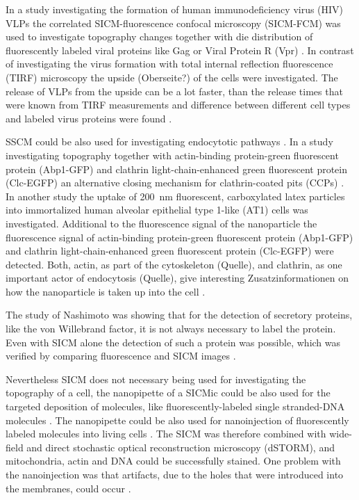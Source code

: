 In a study investigating the formation of human immunodeficiency virus (HIV) VLPs the correlated
SICM-fluorescence confocal microscopy (SICM-FCM) was used to investigate topography changes
together with die distribution of fluorescently labeled viral proteins like Gag or Viral Protein R 
(Vpr) \cite{Bednarska2020}. In contrast of investigating the virus formation with total internal 
reflection fluorescence (TIRF) microscopy \cite{Jouvenet2008} the upside (Oberseite?) of the cells 
were investigated. The release of VLPs from the upside can be a lot faster, than the release times 
that were known from TIRF measurements and difference between different cell types and labeled 
virus proteins were found \cite{Bednarska2020}. 

SSCM could be also used for investigating endocytotic pathways \cite{Shevchuk2008}. In a study 
investigating topography together with actin-binding protein-green fluorescent protein (Abp1-GFP)
and clathrin light-chain-enhanced green fluorescent protein (Clc-EGFP) an alternative closing 
mechanism for clathrin-coated pits (CCPs) \cite{Shevchuk2012}. In another study the uptake of
200~nm fluorescent, carboxylated latex particles into immortalized human alveolar epithelial type
1-like (AT1) cells was investigated. Additional to the fluorescence signal of the nanoparticle the 
fluorescence signal of actin-binding protein-green fluorescent protein (Abp1-GFP) and clathrin
light-chain-enhanced green fluorescent protein (Clc-EGFP) were detected. Both, actin, as part of
the cytoskeleton (Quelle), and clathrin, as one important actor of endocytosis (Quelle), give 
interesting Zusatzinformationen on how the nanoparticle is taken up into the cell 
\cite{Novak2014}. 

The study of Nashimoto was showing that for the detection of secretory proteins, like the von 
Willebrand factor, it is not always necessary to label the protein. Even with SICM alone the 
detection of such a protein was possible, which was verified by comparing fluorescence and SICM 
images \cite{Nashimoto2015}.

Nevertheless SICM does not necessary being used for investigating the topography of a cell, 
the nanopipette of a SICMic could be also used for the targeted deposition of molecules, like 
fluorescently-labeled single stranded-DNA molecules \cite{Ying2002,Hennig2015}. The nanopipette 
could be also used for nanoinjection of fluorescently labeled molecules into living cells 
\cite{Hennig2015a}. The SICM was therefore combined with wide-field and direct stochastic 
optical reconstruction microscopy (dSTORM), and mitochondria, actin and DNA could be successfully 
stained. One problem with the nanoinjection was that artifacts, due to the holes that were 
introduced into the membranes, could occur \cite{Hennig2015a}.

